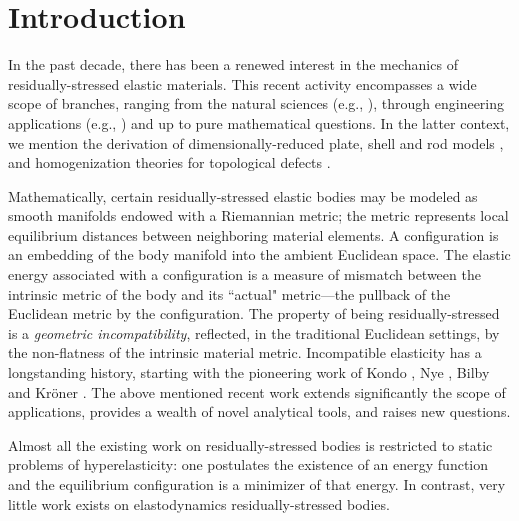 \documentclass[smallextended]{svjour3}
\begin{document}
\section{Introduction}

In the past decade, there has been a renewed interest in the mechanics of residually-stressed elastic materials. This recent activity encompasses a wide scope of branches, ranging from the natural sciences (e.g., \cite{FSDM05,LM09,AAESK12}), through engineering applications (e.g., \cite{KES07}) and up to pure mathematical questions. In the latter context, we mention the derivation of dimensionally-reduced plate, shell and rod models \cite{LP10,KS14,KM14}, and homogenization theories for topological defects \cite{KM15,KM16,KMR16}.   

Mathematically, certain residually-stressed elastic bodies may be modeled as smooth manifolds endowed with a Riemannian metric; the metric represents local equilibrium distances between neighboring material elements. A configuration is an embedding of the body manifold into the ambient Euclidean space. The elastic energy associated with a configuration is a measure of mismatch between the intrinsic metric of the body and its ``actual" metric---the pullback of the Euclidean metric by the configuration. The property of being residually-stressed is  a \emph{geometric incompatibility}, reflected,  in the traditional Euclidean settings, by the non-flatness of the intrinsic material metric. Incompatible elasticity has a longstanding history, starting with the pioneering work of Kondo \cite{Kon55}, Nye \cite{Nye53}, Bilby \cite{BBS55} and Kr\"oner \cite{Kro81}. The above mentioned recent work extends significantly the scope of applications,  provides a wealth of novel analytical tools, and raises new questions.

Almost all the existing work on residually-stressed bodies is restricted to static problems of hyperelasticity: one postulates the existence of an energy function and the equilibrium configuration is a minimizer of that energy. In contrast, very little work exists on elastodynamics residually-stressed bodies. 
\end{document}
